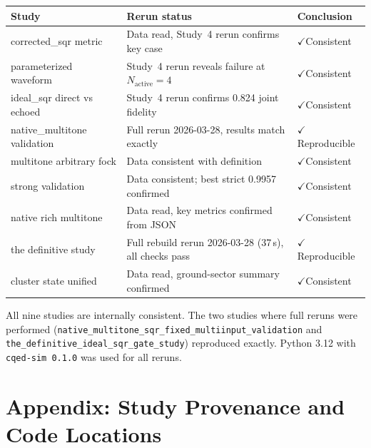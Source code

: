 \documentclass[11pt,letterpaper]{article}
\newcommand{\nact}{N_{\text{active}}}
\newcommand{\passmark}{\textcolor{pass}{$\checkmark$}}
\begin{document}
\begin{center}
\begin{tabular}{lll}
\toprule
Study & Rerun status & Conclusion \\
\midrule
corrected\_sqr metric & Data read, Study~4 rerun confirms key case & \passmark Consistent \\
parameterized waveform & Study~4 rerun reveals failure at $\nact = 4$ & \passmark Consistent \\
ideal\_sqr direct vs echoed & Study~4 rerun confirms 0.824 joint fidelity & \passmark Consistent \\
native\_multitone validation & Full rerun 2026-03-28, results match exactly & \passmark Reproducible \\
multitone arbitrary fock & Data consistent with definition & \passmark Consistent \\
strong validation & Data consistent; best strict 0.9957 confirmed & \passmark Consistent \\
native rich multitone & Data read, key metrics confirmed from JSON & \passmark Consistent \\
the definitive study & Full rebuild rerun 2026-03-28 (37\,s), all checks pass & \passmark Reproducible \\
cluster state unified & Data read, ground-sector summary confirmed & \passmark Consistent \\
\bottomrule
\end{tabular}
\end{center}

\noindent
All nine studies are internally consistent. The two studies where full reruns
were performed (\texttt{native\_multitone\_sqr\_fixed\_multiinput\_validation} and
\texttt{the\_definitive\_ideal\_sqr\_gate\_study}) reproduced exactly.
Python 3.12 with \texttt{cqed-sim 0.1.0} was used for all reruns.

\section*{Appendix: Study Provenance and Code Locations}
\end{document}
